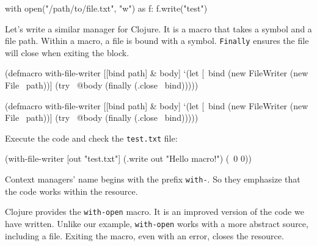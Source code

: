 
\begin{english}
  \begin{python}
with open("/path/to/file.txt", "w") as f:
    f.write("test")
  \end{python}
\end{english}

Let's write a similar manager for Clojure. It is a macro that takes a symbol and a file path. Within a macro, a file is bound with a symbol. \verb|Finally| ensures the file will close when exiting the block.


\ifx\DEVICETYPE\MOBILE

\begin{english}
  \begin{clojure}
(defmacro with-file-writer
  [[bind path] & body]
  `(let [~bind (new FileWriter
                 (new File ~path))]
     (try
       ~@body
       (finally
         (.close ~bind)))))
  \end{clojure}
\end{english}

\else

\begin{english}
  \begin{clojure}
(defmacro with-file-writer
  [[bind path] & body]
  `(let [~bind (new FileWriter (new File ~path))]
     (try
       ~@body
       (finally
         (.close ~bind)))))
  \end{clojure}
\end{english}

\fi

Execute the code and check the \verb|test.txt| file:

\begin{english}
  \begin{clojure}
(with-file-writer [out "test.txt"]
  (.write out "Hello macro!")
  (\ 0 0))
  \end{clojure}
\end{english}

Context managers' name begins with the prefix \verb|with-|. So they emphasize that the code works within the resource.


Clojure provides the \verb|with-open| macro. It is an improved version of the code we have written. Unlike our example, \verb|with-open| works with a more abstract source, including a file. Exiting the macro, even with an error, closes the resource.

